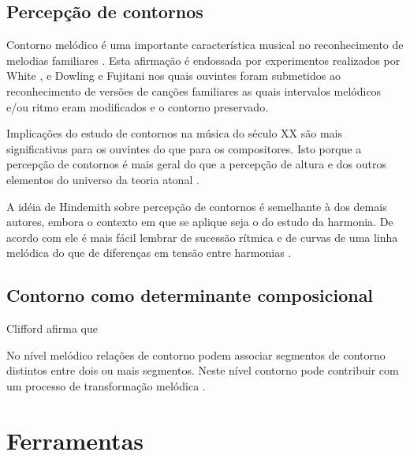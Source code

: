 \section{Percepção de contornos}
\label{sec:perc-de-cont}

Contorno melódico é uma importante característica musical no
reconhecimento de melodias familiares
\cite[p. 136]{dowling.ea86:music}. Esta afirmação é endossada por
experimentos realizados por White \cite{white60:recognition}, e
Dowling e Fujitani \cite{dowling.ea71:contour} nos quais ouvintes
foram submetidos ao reconhecimento de versões de canções familiares as
quais intervalos melódicos e/ou ritmo eram modificados e o contorno
preservado.

Implicações do estudo de contornos na música do século XX são mais
significativas para os ouvintes do que para os compositores. Isto
porque a percepção de contornos é mais geral do que a percepção de
altura e dos outros elementos do universo da teoria atonal
\cite[p. 224]{friedmann85:methodology}.

A idéia de Hindemith sobre percepção de contornos é semelhante à dos
demais autores, embora o contexto em que se aplique seja o do estudo
da harmonia. De acordo com ele é mais fácil lembrar de sucessão
rítmica e de curvas de uma linha melódica do que de diferenças em
tensão entre harmonias \cite[p. 175]{hindemith41:craft}.

\section{Contorno como determinante composicional}
\label{sec:cont-como-determ}

Clifford afirma que



No nível melódico relações de contorno podem associar segmentos de
contorno distintos entre dois ou mais segmentos. Neste nível contorno
pode contribuir com um processo de transformação melódica
\cite[p. 159]{clifford95:contour}.

\chapter{Ferramentas}
\label{cha:ferramentas}

